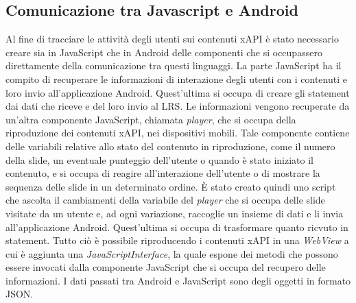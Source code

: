\documentclass[../Tesi.tex]{subfiles}
\begin{document}
	\subsection{Comunicazione tra Javascript e Android}
	Al fine di tracciare le attività degli utenti sui contenuti xAPI è stato necessario creare sia in JavaScript che in Android delle componenti che si occupassero direttamente della comunicazione tra questi linguaggi. La parte JavaScript ha il compito di recuperare le informazioni di interazione degli utenti con i contenuti e loro invio all'applicazione Android. Quest'ultima si occupa di creare gli statement dai dati che riceve e del loro invio al LRS. Le informazioni vengono recuperate da un'altra componente JavaScript, chiamata \textit{player}, che si occupa della riproduzione dei contenuti xAPI, nei dispositivi mobili. Tale componente contiene delle variabili relative allo stato del contenuto in riproduzione, come il numero della slide, un eventuale punteggio dell'utente o quando è stato iniziato il contenuto, e si occupa di reagire all'interazione dell'utente o di mostrare la sequenza delle slide in un determinato ordine. 
	È stato creato quindi uno script che ascolta il cambiamenti della variabile del \textit{player} che si occupa delle slide visitate da un utente e, ad ogni variazione, raccoglie un insieme di dati e li invia all'applicazione Android. Quest'ultima si occupa di trasformare quanto ricvuto in statement. Tutto ciò è possibile riproducendo i contenuti xAPI in una \textit{WebView} a cui è aggiunta una \textit{JavaScriptInterface}, la quale espone dei metodi che possono essere invocati dalla componente JavaScript che si occupa del recupero delle informazioni. I dati passati tra Android e JavaScript sono degli oggetti in formato JSON.
\end{document}

